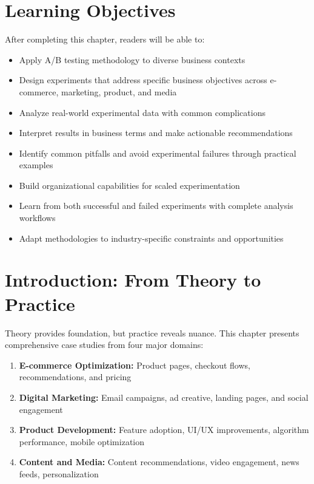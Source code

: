
\section{Learning Objectives}

After completing this chapter, readers will be able to:
\begin{itemize}
    \item Apply A/B testing methodology to diverse business contexts
    \item Design experiments that address specific business objectives across e-commerce, marketing, product, and media
    \item Analyze real-world experimental data with common complications
    \item Interpret results in business terms and make actionable recommendations
    \item Identify common pitfalls and avoid experimental failures through practical examples
    \item Build organizational capabilities for scaled experimentation
    \item Learn from both successful and failed experiments with complete analysis workflows
    \item Adapt methodologies to industry-specific constraints and opportunities
\end{itemize}

\section{Introduction: From Theory to Practice}

Theory provides foundation, but practice reveals nuance. This chapter presents comprehensive case studies from four major domains:

\begin{enumerate}
    \item \textbf{E-commerce Optimization:} Product pages, checkout flows, recommendations, and pricing
    \item \textbf{Digital Marketing:} Email campaigns, ad creative, landing pages, and social engagement
    \item \textbf{Product Development:} Feature adoption, UI/UX improvements, algorithm performance, mobile optimization
    \item \textbf{Content and Media:} Content recommendations, video engagement, news feeds, personalization
\end{enumerate}

